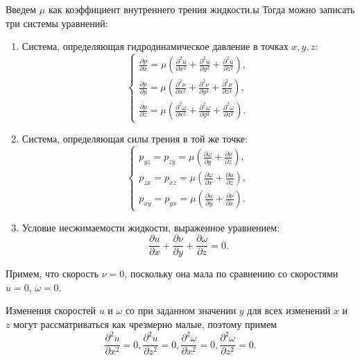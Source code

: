 \documentclass[a4paper,14pt]{extarticle}
\begin{document}
Введем $\mu$ как коэффициент внутреннего трения жидкости.ы
Тогда можно записать три системы уравнений:
\begin{enumerate}
	\item Система, определяющая гидродинамическое давление в
	точках $x, y, z$:
	\begin{equation}
		\label{eqfi}
		\begin{cases}
			\frac{\partial p}{\partial x} = \mu \left( \frac{\partial^2 u}{\partial x^2} + \frac{\partial^2 u}{\partial y^2} + \frac{\partial^2 u}{\partial z^2} \right), \\
			\frac{\partial p}{\partial y} = \mu \left( \frac{\partial^2 \nu}{\partial x^2} + \frac{\partial^2 \nu}{\partial y^2} + \frac{\partial^2 \nu}{\partial z^2} \right), \\
			\frac{\partial p}{\partial z} = \mu \left( \frac{\partial^2 \omega}{\partial x^2} + \frac{\partial^2 \omega}{\partial y^2} + \frac{\partial^2 \omega}{\partial z^2} \right).
		\end{cases}
	\end{equation}
	\item Система, определяющая силы трения в той же точке:
	\begin{equation}
		\label{eqsi}
		\begin{cases}
			p_{yz} = p_{zy} = \mu \left(\frac{\partial \omega}{\partial y} + \frac{\partial \nu}{\partial z} \right), \\
			p_{zx} = p_{xz} = \mu \left( \frac{\partial \omega}{\partial x} +  \frac{\partial u}{\partial z} \right), \\
			p_{xy} = p_{yx} = \mu \left(  \frac{\partial u}{\partial y} + \frac{\partial \nu}{\partial x} \right).
		\end{cases}
	\end{equation}
	\item Условие несжимаемости жидкости, выраженное уравнением: 
	\begin{equation}
		\label{eqthi}
		\frac{\partial u}{\partial x} + \frac{\partial \nu}{\partial y} + \frac{\partial \omega}{\partial z} = 0.
	\end{equation}
	
\end{enumerate}

Примем, что скорость $\nu = 0$, поскольку она мала по сравнению со скоростями $u = 0$, $\omega = 0$.

Изменения скоростей $u$ и $\omega$ со при заданном значении $y$ для всех изменений $ x $ и $z$ могут рассматриваться как чрезмерно малые, поэтому примем
\[
\frac{\partial^2 u}{\partial x^2} = 0, 
\frac{\partial^2 u}{\partial z^2} = 0, 
\frac{\partial^2 \omega}{\partial x^2} = 0, 
\frac{\partial^2 \omega}{\partial z^2} = 0. 
\]
\end{document}
